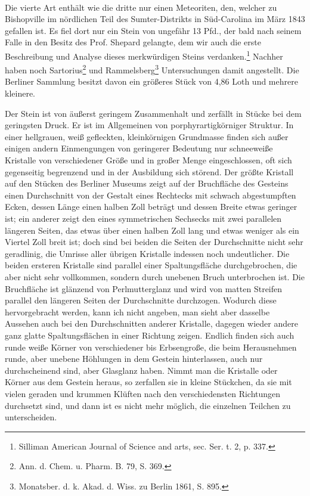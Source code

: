 \documentclass[a4paper, 11pt, oneside]{article}
\begin{document}
\paragraph{}
Die vierte Art enthält wie die dritte nur einen Meteoriten, den, welcher zu Bishopville im nördlichen Teil des Sumter-Distrikts in Süd-Carolina im März 1843 gefallen ist. Es fiel dort nur ein Stein von ungefähr 13 Pfd., der bald nach seinem Falle in den Besitz des Prof. Shepard gelangte, dem wir auch die erste Beschreibung und Analyse dieses merkwürdigen Steins verdanken.\footnote{Silliman American Journal of Science and arts, sec. Ser. t. 2, p. 337.} Nachher haben noch Sartorius\footnote{Ann. d. Chem. u. Pharm. B. 79, S. 369.} und Rammelsberg\footnote{Monatsber. d. k. Akad. d. Wiss. zu Berlin 1861, S. 895.} Untersuchungen damit angestellt. Die Berliner Sammlung besitzt davon ein größeres Stück von 4,86 Loth und mehrere kleinere.

Der Stein ist von äußerst geringem Zusammenhalt und zerfällt in Stücke bei dem geringsten Druck. Er ist im Allgemeinen von porphyrartigkörniger Struktur. In einer hellgrauen, weiß gefleckten, kleinkörnigen Grundmasse finden sich außer einigen andern Einmengungen von geringerer Bedeutung nur schneeweiße Kristalle von verschiedener Größe und in großer Menge eingeschlossen, oft sich gegenseitig begrenzend und in der Ausbildung sich störend. Der größte Kristall auf den Stücken des Berliner Museums zeigt auf der Bruchfläche des Gesteins einen Durchschnitt von der Gestalt eines Rechtecks mit schwach abgestumpften Ecken, dessen Länge einen halben Zoll beträgt und dessen Breite etwas geringer ist; ein anderer zeigt den eines symmetrischen Sechsecks mit zwei parallelen längeren Seiten, das etwas über einen halben Zoll lang und etwas weniger als ein Viertel Zoll breit ist; doch sind bei beiden die Seiten der Durchschnitte nicht sehr geradlinig, die Umrisse aller übrigen Kristalle indessen noch undeutlicher. Die beiden ersteren Kristalle sind parallel einer Spaltungsfläche durchgebrochen, die aber nicht sehr vollkommen, sondern durch unebenen Bruch unterbrochen ist. Die Bruchfläche ist glänzend von Perlmutterglanz und wird von matten Streifen parallel den längeren Seiten der Durchschnitte durchzogen. Wodurch diese hervorgebracht werden, kann ich nicht angeben, man sieht aber dasselbe Aussehen auch bei den Durchschnitten anderer Kristalle, dagegen wieder andere ganz glatte Spaltungsflächen in einer Richtung zeigen. Endlich finden sich auch runde weiße Körner von verschiedener bis Erbsengroße, die beim Herausnehmen runde, aber unebene Höhlungen in dem Gestein hinterlassen, auch nur durchscheinend sind, aber Glasglanz haben. Nimmt man die Kristalle oder Körner aus dem Gestein heraus, so zerfallen sie in kleine Stückchen, da sie mit vielen geraden und krummen Klüften nach den verschiedensten Richtungen durchsetzt sind, und dann ist es nicht mehr möglich, die einzelnen Teilchen zu unterscheiden.
\end{document}
